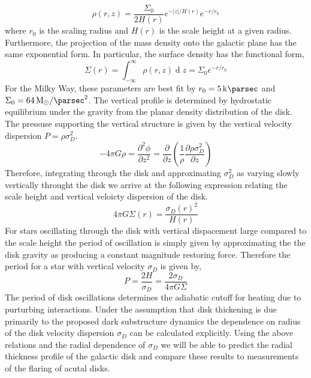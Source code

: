 \documentclass[usenatbib]{mnras}
\renewcommand{\d}[1]{\! \mathrm{d}#1 \:}
\newcommand{\pderiv}[2]{\frac{\partial{#1}}{\partial{#2}}}
\renewcommand{\d}[1]{\ensuremath{\operatorname{d}\!{#1}}}
\begin{document}
\begin{equation}
\rho(r, z) = \frac{\Sigma_0}{2 H(r)} e^{-|z| / H(r)} e^{-r/r_0}
\end{equation}
where $r_0$ is the scaling radius and $H(r)$ is the scale height at a given radius. Furthermore, the projection of the mass density onto the galactic plane has the same exponential form. In particular, the surface density has the functional form,
\begin{equation}
\Sigma(r) = \int_{-\infty}^{\infty} \rho(r, z) \d{z} = \Sigma_0 e^{-r / r_0}
\end{equation}
For the Milky Way, these parameters are best fit by $r_0 = \SI{5}{\kilo \parsec}$ and $\Sigma_0 = \SI{64}{M_{\odot} \per \parsec \squared}$. The vertical profile is determined by hydrostatic equilibrium under the gravity from the planar density distribution of the disk. The pressuse supporting the vertical structure is given by the vertical velocity dispersion $P = \rho \sigma_D^2$. 
\begin{equation}
- 4 \pi G \rho = \frac{\partial^2 \phi}{\partial z^2} = \pderiv{}{z} \left( \frac{1}{\rho} \pderiv{ \rho \sigma_D^2}{z} \right)
\end{equation}  
Therefore, integrating through the disk and approximating $\sigma_D^2$ as varying slowly vertically throught the disk we arrive at the following expression relating the scale height and vertical veloicty dispersion of the disk.
\begin{equation} \label{scale}
4 \pi G \Sigma(r) = \frac{ \sigma_D(r)^2 }{H(r)}
\end{equation}
For stars oscillating through the disk with vertical dispacement large compared to the scale height the period of oscillation is simply given by approximating the the disk gravity as producing a constant magnitude restoring force. Therefore the period for a star with vertical velocity $\sigma_D$ is given by,
\begin{equation}
P = \frac{2 H}{\sigma_D} = \frac{2 \sigma_D}{4 \pi G \Sigma}
\end{equation}
The period of disk oscillations determines the adiabatic cutoff for heating due to purturbing interactions. Under the assumption that disk thickening is due primarily to the proposed dark substructure dynamics the dependence on radius of the disk velocity dispersion $\sigma_D$ can be calculated explicitly. Using the above relations and the radial dependence of $\sigma_D$ we will be able to predict the radial thickness profile of the galactic disk and compare these results to measurements of the flaring of acutal disks.  
\end{document}
